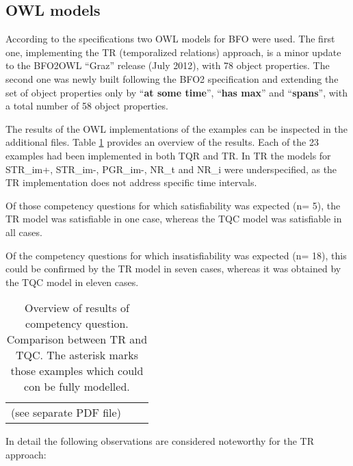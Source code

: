 \subsection*{OWL models}



According to the specifications two OWL models for BFO were used. 
The first one, implementing the TR (temporalized relations) approach, is a minor update to the BFO2OWL ``Graz'' release 
(July 2012), with 78 object properties. 
The second one was newly built following the BFO2 specification and extending the set of object properties 
only by ``\textbf{at some time}'', ``\textbf{has max}'' and ``\textbf{spans}'', with a total number of 58 object properties. 

The results of the OWL implementations of the examples can be inspected in the additional files. 
Table \ref{tab:results} provides an overview of the results. Each of the 23 examples had been implemented in both TQR and TR. In TR
the models for STR\_im+, STR\_im-, PGR\_im-, NR\_t and NR\_i were underspecified, 
as the TR implementation does not address specific time intervals. 

Of those competency questions for which satisfiability was expected (n= 5), the TR model 
was satisfiable in one case, whereas the TQC model was satisfiable in all cases.  

Of the competency questions for which insatisfiability was expected (n= 18), 
this could be confirmed by the TR model in seven cases, whereas it was obtained by the TQC model in eleven cases. 

\begin{table}
\caption{Overview of results of competency question. Comparison between TR and TQC.  The asterisk 
marks those examples which could con be fully modelled.}
\label{tab:results}
{
\begin{tabular}{p{10.9em}cp{10.5em}}
\parskip=0cm
\parbox{10.9em}{(see separate PDF file)} \\
\end{tabular}
}
\end{table}






In detail the following observations are considered noteworthy for the TR approach:

